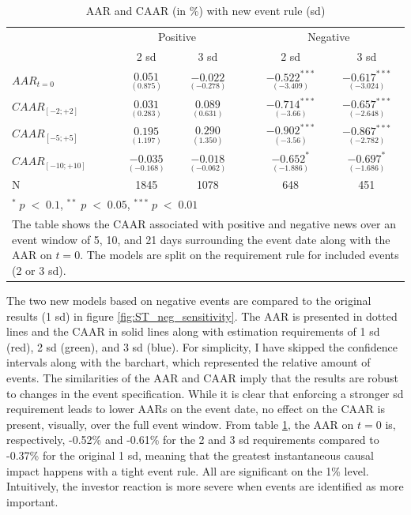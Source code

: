 \begin{table}[ht]
\centering
\caption{AAR and CAAR (in \%) with new event rule (sd)} 
\begin{tabular}{lccccc}
  \hline  \hline
  & \multicolumn{2}{c}{Positive} &  & \multicolumn{2}{c}{Negative}\\ \cline{2-3} \cline{5-6}  
  & 2 sd & 3 sd & & 2 sd & 3 sd   \\   
 \hline
$AAR_{t=0}$ & $\underset{(0.875)}{0.051}$ & $\underset{(-0.278)}{-0.022}$ & & $\underset{(-3.409)}{-0.522^{***}}$ & $\underset{(-3.024)}{-0.617^{***}}$ \\ 
$CAAR_{[-2;+2]}$  & $\underset{(0.283)}{0.031}$  & $\underset{(0.631)}{0.089}$ & & $\underset{(-3.66)}{-0.714^{***}}$ & $\underset{(-2.648)}{-0.657^{***}}$ \\ 
$CAAR_{[-5;+5]}$  & $\underset{(1.197)}{0.195}$  & $\underset{(1.350)}{0.290}$ & &$\underset{(-3.56)}{-0.902^{***}}$ & $\underset{(-2.782)}{-0.867^{***}}$ \\ 
$CAAR_{[-10;+10]}$  & $\underset{(-0.168)}{-0.035}$  & $\underset{(-0.062)}{-0.018}$ &  & $\underset{(-1.886)}{-0.652^{*}}$ & $\underset{(-1.686)}{-0.697^{*}}$ \\ 
N & 1845 & 1078 & & 648 & 451  \\
   \hline \hline
   \multicolumn{6}{p{12cm}}{ \footnotesize $^* \; p\; <\; 0.1$, $ ^{**} \; p\; <\; 0.05$, $ ^{***} \; p\; <\; 0.01$  } \\
   \multicolumn{6}{p{13cm}}{\footnotesize The table shows the CAAR associated with positive and negative news over an event window of 5, 10, and 21 days surrounding the event date along with the AAR on $t=0$. The models are split on the requirement rule for included events (2 or 3 sd).} \\
   \hline
\end{tabular}
\label{tab:ST_sensitivity}
\end{table}

The two new models based on negative events are compared to the original results (1 sd) in figure \ref{fig:ST_neg_sensitivity}. The AAR is presented in dotted lines and the CAAR in solid lines along with estimation requirements of 1 sd (red), 2 sd (green), and 3 sd (blue). For simplicity, I have skipped the confidence intervals along with the barchart, which represented the relative amount of events. The similarities of the AAR and CAAR imply that the results are robust to changes in the event specification. While it is clear that enforcing a stronger sd requirement leads to lower AARs on the event date, no effect on the CAAR is present, visually, over the full event window. From table \ref{tab:ST_sensitivity}, the AAR on $t=0$ is, respectively, -0.52\% and -0.61\% for the 2 and 3 sd requirements compared to -0.37\% for the original 1 sd, meaning that the greatest instantaneous causal impact happens with a tight event rule. All are significant on the 1\% level. Intuitively, the investor reaction is more severe when events are identified as more important.  


